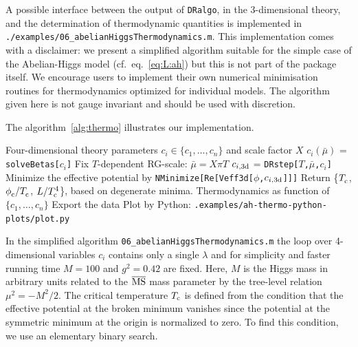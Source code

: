 \documentclass[11pt]{article}
\def\dralgo{{\tt DRalgo}}
\newcommand\MSbar{$\overline{\rm MS}$}
\newcommand{\Tc}{T_{\rm c}}
\renewcommand{\rmi}[1]{{\mbox{\scriptsize #1}}}
\begin{document}
A possible interface between
the output of \dralgo{}, in the 3-dimensional theory, and
the determination of thermodynamic quantities 
is implemented in {\tt ./examples/06\_abelianHiggsThermodynamics.m}.
This implementation comes with a disclaimer:
we present a simplified algorithm suitable for the simple case of
the Abelian-Higgs model (cf.~eq.~\eqref{eq:L:ah}) but this
is not part of the package itself.
We encourage users to implement their own numerical minimisation routines
for thermodynamics optimized for individual models.
The algorithm given here is not gauge invariant and
should be used with discretion. 

The algorithm~\ref{alg:thermo} illustrates our implementation.
\begin{algorithm}
\caption{
\label{alg:thermo}
  The \dralgo{} algorithm output is interfaced in
  {\tt ./examples/06\_abelianHiggsThermodynamics.m} with functions
  {\tt solveBetas[]},
  {\tt DRstep[]} and
  {\tt Veff3d[]}, which are called by
  {\tt findThermo[]}.
}
\begin{algorithmic}
  Four-dimensional theory parameters $c_{i} \in \{c_{1},\dots,c_{n}\}$ and
  scale factor $X$
        $c_i(\bar{\mu})$ = {\tt solveBetas[$c_i$]}
    \For{{\bf all}  $T_{i} \in \{T_{\rmi{min}},\dots,T_{\rmi{max}} \}$} 
      \State Fix $T$-dependent RG-scale: $\bar{\mu} = X\pi T$ 
        $c_{i,\rmi{3d}}$ = {\tt DRstep[$T$,$\bar{\mu}$,$c_i$]}
      \State
        Minimize the effective potential by
        {\tt NMinimize[Re[Veff3d[$\phi$,$c_{i,\rmi{3d}}$]]]}
    \EndFor
\State
  Return \{$\Tc^{ }$, $\phi_{\rmi{c}}^{ }/\Tc^{ }$, $L/\Tc^4$\},
  based on degenerate minima.
\EndCall
\EndFor
{}
Thermodynamics as function of $\{c_{1},\dots,c_{n}\}$
\State Export the data
\State Plot by Python: {\tt .examples/ah-thermo-python-plots/plot.py}
\end{algorithmic}
\end{algorithm}
In the simplified algorithm {\tt 06\_abelianHiggsThermodynamics.m}
the loop over 4-dimensional variables $c_i$ contains only a single $\lambda$ and
for simplicity and faster running time
$M=100$ and
$g^2=0.42$ are fixed.
Here,
$M$ is the Higgs mass in arbitrary units related to
the \MSbar{} mass parameter by
the tree-level relation $\mu^2 = -M^2/2$. 
%
The critical temperature $\Tc$ is defined from the condition that
the effective potential at the broken minimum vanishes since
the potential at the symmetric minimum at the origin is normalized to zero. 
To find this condition, we use an elementary binary search.
\end{document}
